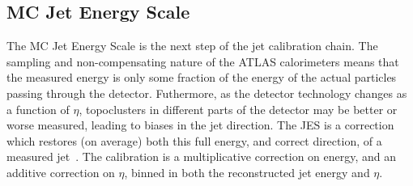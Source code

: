 

\subsection{MC Jet Energy Scale}
\label{jet-reconstruction:jet-calibration-mc-jet-energy-scale}

The MC Jet Energy Scale is the next step of the jet calibration chain. The sampling and non-compensating nature of the ATLAS calorimeters means that the measured energy is only some fraction of the energy of the actual particles passing through the detector. Futhermore, as the detector technology changes as a function of $\eta$, topoclusters in different parts of the detector may be better or worse measured, leading to biases in the jet direction. The JES is a correction which restores (on average) both this full energy, and correct direction, of a measured jet~\cite{JES2010}. The calibration is a multiplicative correction on energy, and an additive correction on $\eta$, binned in both the reconstructed jet energy and $\eta$.

